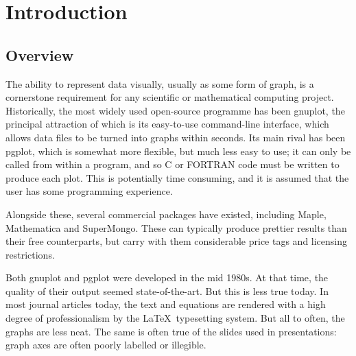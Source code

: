 %
%
%
%
%



\chapter{Introduction}

\label{introduction}

\section{Overview}

The ability to represent data visually, usually as some form of graph, is a
cornerstone requirement for any scientific or mathematical computing project.
Historically, the most widely used open-source programme has been {\sc
gnuplot}, the principal attraction of which is its easy-to-use command-line
interface, which allows data files to be turned into graphs within seconds. Its
main rival has been {\sc pgplot}, which is somewhat more flexible, but much
less easy to use; it can only be called from within a program, and so C or
FORTRAN code must be written to produce each plot. This is potentially time
consuming, and it is assumed that the user has some programming experience.

Alongside these, several commercial packages have existed, including {\sc
Maple}, {\sc Mathematica} and {\sc SuperMongo}.  These can typically produce
prettier results than their free counterparts, but carry with them considerable
price tags and licensing restrictions.

Both gnuplot and pgplot were developed in the mid 1980s. At that time, the
quality of their output seemed state-of-the-art. But this is less true today.
In most journal articles today, the text and equations are rendered with a high
degree of professionalism by the \LaTeX\ typesetting system. But all to often,
the graphs are less neat.  The same is often true of the slides used in
presentations: graph axes are often poorly labelled or illegible.

